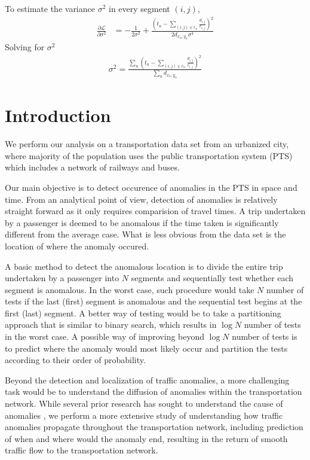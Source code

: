 \documentclass{sig-alternate}
\begin{document}
To estimate the variance $\sigma^2$ in every segment $(i,j)$, 
\begin{align}
	\frac{\partial \mathcal{L}}{\partial \sigma^2} &= - \frac{1}{ 2 \sigma^2 } + \frac{ \left( t_n - \sum_{ (i,j) \in r_n } \frac{d_{i,j}}{c_{i,j}} \right)^2}{ 2 d_{x_n, y_n} \sigma^4 }
\end{align}
Solving for $\sigma^2$
\begin{align}
	\sigma^2 = \frac{ \sum_n \left( t_n - \sum_{ (i,j) \in r_n } \frac{d_{i,j}}{c_{i,j}} \right)^2}{\sum_n d_{x_n, y_n}}
\end{align}

\section{Introduction}

We perform our analysis on a transportation data set from an urbanized city, where majority of the population uses the public transportation system (PTS) which includes a network of railways and buses. 

Our main objective is to detect occurence of anomalies in the PTS in space and time. From an analytical point of view, detection of anomalies is relatively straight forward as it only requires comparision of travel times. A trip undertaken by a passenger is deemed to be anomalous if the time taken is significantly different from the average case. What is less obvious from the data set is the location of where the anomaly occured.

A basic method to detect the anomalous location is to divide the entire trip undertaken by a passenger into $N$ segments and sequentially test whether each segment is anomalous. In the worst case, such procedure would take $N$ number of tests if the last (first) segment is anomalous and the sequential test begins at the first (last) segment. A better way of testing would be to take a partitioning approach that is similar to binary search, which results in $\log N$ number of tests in the worst case. A possible way of improving beyond $\log N$ number of tests is to predict where the anomaly would most likely occur and partition the tests according to their order of probability.

Beyond the detection and localization of traffic anomalies, a more challenging task would be to understand the diffusion of anomalies within the transportation network. While several prior research has sought to understand the cause of anomalies \cite{Chawla2012,Liu2011}, we perform a more extensive study of understanding how traffic anomalies propagate throughout the transportation network, including prediction of when and where would the anomaly end, resulting in the return of smooth traffic flow to the transportation network. %
\end{document}
